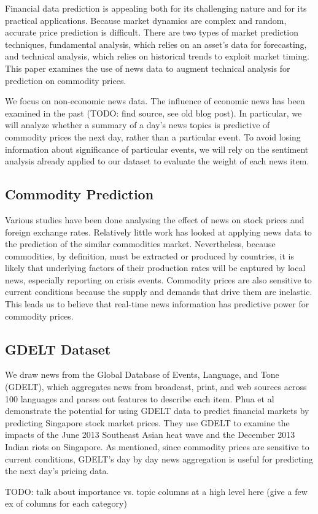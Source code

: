 Financial data prediction is appealing both for its challenging nature and for its practical applications. Because market dynamics are complex and random, accurate price prediction is difficult. There are two types of market prediction techniques, fundamental analysis, which relies on an asset's data for forecasting, and technical analysis, which relies on historical trends to exploit market timing.\cite{schumaker2009textual} This paper examines the use of news data to augment technical analysis for prediction on commodity prices.

We focus on non-economic news data. The influence of economic news has been examined in the past (TODO: find source, see old blog post). In particular, we will analyze whether a summary of a day's news topics is predictive of commodity prices the next day, rather than a particular event. To avoid losing information about significance of particular events, we will rely on the sentiment analysis already applied to our dataset to evaluate the weight of each news item.

\subsection{Commodity Prediction}
Various studies have been done analysing the effect of news on stock prices\cite{mcqueen1993stock} and foreign exchange rates\cite{kamruzzaman2003svm}. Relatively little work has looked at applying news data to the prediction of the similar commodities market. Nevertheless, because commodities, by definition, must be extracted or produced by countries, it is likely that underlying factors of their production rates will be captured by local news, especially reporting on crisis events. Commodity prices are also sensitive to current conditions because the supply and demands that drive them are inelastic.\cite{chen2008can} This leads us to believe that real-time news information has predictive power for commodity prices. 

\subsection{GDELT Dataset}
We draw news from the Global Database of Events, Language, and Tone (GDELT), which aggregates news from broadcast, print, and web sources across 100 languages and parses out features to describe each item. Phua et al demonstrate the potential for using GDELT data to predict financial markets by predicting Singapore stock market prices. They use GDELT  to examine the impacts of the June 2013 Southeast Asian heat wave and the December 2013 Indian riots on Singapore.\cite{phua2014visual} As mentioned, since commodity prices are sensitive to current conditions, GDELT's day by day news aggregation is useful for predicting the next day's pricing data.

TODO: talk about importance vs. topic columns at a high level here (give a few ex of columns for each category)